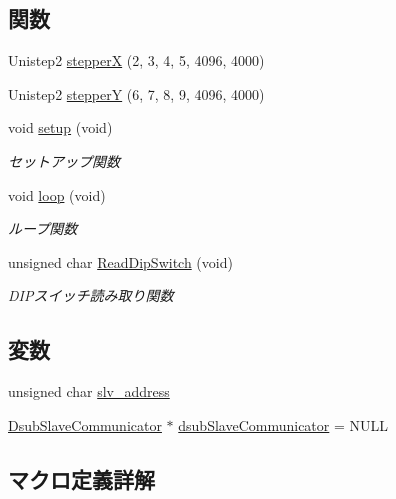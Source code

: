 \subsection*{関数}
\begin{DoxyCompactItemize}
\item 
Unistep2 \mbox{\hyperlink{iraira__bo__gear__mod_8ino_ab878708a6469aa07f545fffe2a4e9f87}{stepperX}} (2, 3, 4, 5, 4096, 4000)
\item 
Unistep2 \mbox{\hyperlink{iraira__bo__gear__mod_8ino_a9d5f62c0e294c8b8e721af81f242560b}{stepperY}} (6, 7, 8, 9, 4096, 4000)
\item 
void \mbox{\hyperlink{iraira__bo__gear__mod_8ino_a7dfd9b79bc5a37d7df40207afbc5431f}{setup}} (void)
\begin{DoxyCompactList}\small\item\em セットアップ関数 \end{DoxyCompactList}\item 
void \mbox{\hyperlink{iraira__bo__gear__mod_8ino_a0b33edabd7f1c4e4a0bf32c67269be2f}{loop}} (void)
\begin{DoxyCompactList}\small\item\em ループ関数 \end{DoxyCompactList}\item 
unsigned char \mbox{\hyperlink{iraira__bo__gear__mod_8ino_a77b0a767d95108a48a54b857588d2863}{Read\+Dip\+Switch}} (void)
\begin{DoxyCompactList}\small\item\em D\+I\+Pスイッチ読み取り関数 \end{DoxyCompactList}\end{DoxyCompactItemize}
\subsection*{変数}
\begin{DoxyCompactItemize}
\item 
unsigned char \mbox{\hyperlink{iraira__bo__gear__mod_8ino_aeba7e981bd419ac0d5ca8e5e4198bf06}{slv\+\_\+address}}
\item 
\mbox{\hyperlink{class_dsub_slave_communicator}{Dsub\+Slave\+Communicator}} $\ast$ \mbox{\hyperlink{iraira__bo__gear__mod_8ino_adb2253a9db904473e0b317580548c627}{dsub\+Slave\+Communicator}} = N\+U\+LL
\end{DoxyCompactItemize}


\subsection{マクロ定義詳解}
\mbox{\label{iraira__bo__gear__mod_8ino_a1865ea46eaf057c61c9661e6777e617b}} 
